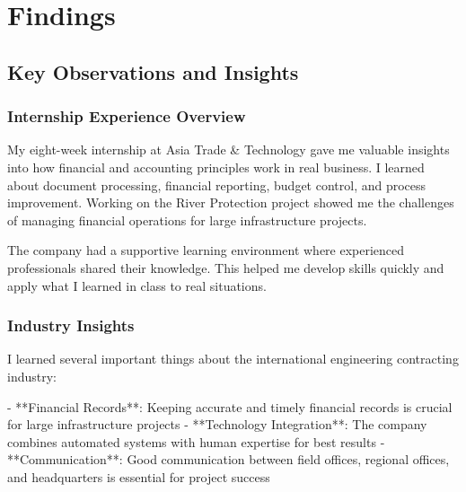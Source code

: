 
\chapter{Findings}

\section{Key Observations and Insights}

\subsection{Internship Experience Overview}
My eight-week internship at Asia Trade \& Technology gave me valuable insights into how financial and accounting principles work in real business. I learned about document processing, financial reporting, budget control, and process improvement. Working on the River Protection project showed me the challenges of managing financial operations for large infrastructure projects.

The company had a supportive learning environment where experienced professionals shared their knowledge. This helped me develop skills quickly and apply what I learned in class to real situations.

\vspace{0.3em}
\subsection{Industry Insights}
I learned several important things about the international engineering contracting industry:

- **Financial Records**: Keeping accurate and timely financial records is crucial for large infrastructure projects
- **Technology Integration**: The company combines automated systems with human expertise for best results
- **Communication**: Good communication between field offices, regional offices, and headquarters is essential for project success

